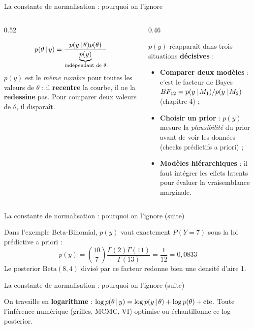 \begin{frame}{La constante de normalisation : pourquoi on l'ignore}
\begin{columns}[t]
\begin{column}{0.52\textwidth}
\begin{kbox}[Le raisonnement]
\[
p(\theta \,\vert\, y) = \frac{p(y \,\vert\, \theta)p(\theta)}{\underbrace{p(y)}_{\text{indépendant de }\theta}}
\]
$p(y)$ est le \emph{même nombre} pour toutes les valeurs de $\theta$ :
il \textbf{recentre} la courbe, il ne la \textbf{redessine} pas. Pour
comparer deux valeurs de $\theta$, il disparaît.
\end{kbox}
\end{column}

\begin{column}{0.46\textwidth}
\begin{wbox}
$p(y)$ réapparaît dans trois situations \textbf{décisives} :
\begin{itemize}
  \item \textbf{Comparer deux modèles} : c'est le facteur de Bayes
        $BF_{12} = p(y \,\vert\, M_1)/p(y \,\vert\, M_2)$ (chapitre 4) ;
  \item \textbf{Choisir un prior} : $p(y)$ mesure la \emph{plausibilité}
        du prior avant de voir les données (checks prédictifs a priori) ;
  \item \textbf{Modèles hiérarchiques} : il faut intégrer les effets
        latents pour évaluer la vraisemblance marginale.
\end{itemize}
\end{wbox}
\end{column}
\end{columns}
\end{frame}

\begin{frame}{La constante de normalisation : pourquoi on l'ignore (suite)}
\begin{ebox}
Dans l'exemple Beta-Binomial, $p(y)$ vaut exactement
$P(Y = 7)$ sous la loi prédictive a priori :
\[
p(y) = \binom{10}{7}\frac{\Gamma(2)\Gamma(11)}{\Gamma(13)} = \frac{1}{12} = 0{,}0833
\]
Le posterior $\mathrm{Beta}(8,4)$ divisé par ce facteur redonne bien une densité d'aire 1.
\end{ebox}
\end{frame}

\begin{frame}{La constante de normalisation : pourquoi on l'ignore (suite)}
\begin{kbox}
On travaille en \textbf{logarithme} :
$\log p(\theta \,\vert\, y) = \log p(y \,\vert\, \theta) + \log p(\theta) + \text{cte}$.
Toute l'inférence numérique (grilles, MCMC, VI) optimise ou échantillonne ce log-posterior.
\end{kbox}

\end{frame}

